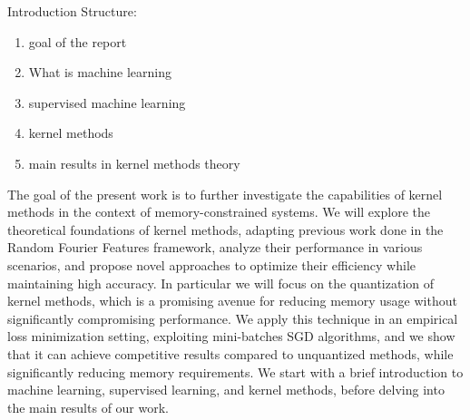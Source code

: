 \setcounter{chapter}{-1}

\begin{chapter}{Introduction}
 Structure:
 \begin{enumerate}
     \item goal of the report
     \item What is machine learning
     \item supervised machine learning
     \item kernel methods
     \item main results in kernel methods theory
 \end{enumerate}
 The goal of the present work is to further investigate the capabilities of kernel methods in the context of memory-constrained systems.
 We will explore the theoretical foundations of kernel methods, adapting previous work done in the Random Fourier Features framework, analyze their performance in various scenarios,
 and propose novel approaches to optimize their efficiency while maintaining high accuracy. In particular we
 will focus on the quantization of kernel methods, which is a promising avenue for reducing memory usage without significantly compromising performance.
 We apply this technique in an empirical loss minimization setting, exploiting mini-batches SGD algorithms, and we show that it can achieve competitive results compared to unquantized methods,
 while significantly reducing memory requirements.
 We start with a brief introduction to machine learning, supervised learning, and kernel methods, before delving into the main results of our work.


\end{chapter}
